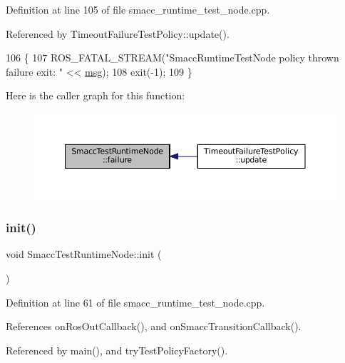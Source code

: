 Definition at line 105 of file smacc\+\_\+runtime\+\_\+test\+\_\+node.\+cpp.



Referenced by Timeout\+Failure\+Test\+Policy\+::update().


\begin{DoxyCode}
106   \{
107     ROS\_FATAL\_STREAM(\textcolor{stringliteral}{"SmaccRuntimeTestNode policy thrown failure exit: "} << \hyperlink{namespacebattery__monitor__node_ab1920c64448816edd4064e494275fdff}{msg});
108     exit(-1);
109   \}
\end{DoxyCode}
Here is the caller graph for this function\+:
\nopagebreak
\begin{figure}[H]
\begin{center}
\leavevmode
\includegraphics[width=350pt]{classSmaccTestRuntimeNode_a58254eca6e6a5f2bde6417a1cccc932a_icgraph}
\end{center}
\end{figure}
\mbox{\label{classSmaccTestRuntimeNode_a8a75b2f3884af285826c7168753b8886}} 
\subsubsection{\texorpdfstring{init()}{init()}}
{\footnotesize\ttfamily void Smacc\+Test\+Runtime\+Node\+::init (\begin{DoxyParamCaption}{ }\end{DoxyParamCaption})\hspace{0.3cm}{\ttfamily [inline]}}



Definition at line 61 of file smacc\+\_\+runtime\+\_\+test\+\_\+node.\+cpp.



References on\+Ros\+Out\+Callback(), and on\+Smacc\+Transition\+Callback().



Referenced by main(), and try\+Test\+Policy\+Factory().


